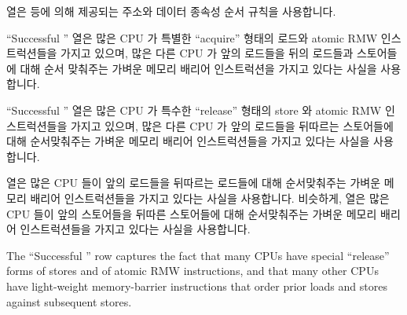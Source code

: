 {	 열은  등에 의해 제공되는
	주소와 데이터 종속성 순서 규칙을 사용합니다.

	``Successful '' 열은 많은 CPU 가 특별한 ``acquire''
	형태의 로드와 atomic RMW 인스트럭션들을 가지고 있으며, 많은 다른 CPU 가
	앞의 로드들을 뒤의 로드들과 스토어들에 대해 순서 맞춰주는 가벼운 메모리
	배리어 인스트럭션을 가지고 있다는 사실을 사용합니다.

	``Successful '' 열은 많은 CPU 가 특수한 ``release''
	형태의 store 와 atomic RMW 인스트럭션들을 가지고 있으며, 많은 다른 CPU
	가 앞의 로드들을 뒤따르는 스토어들에 대해 순서맞춰주는 가벼운 메모리
	배리어 인스트럭션들을 가지고 있다는 사실을 사용합니다.

	 열은 많은 CPU 들이 앞의 로드들을 뒤따르는 로드들에 대해
	순서맞춰주는 가벼운 메모리 배리어 인스트럭션들을 가지고 있다는 사실을
	사용합니다.
	비슷하게,
	 열은 많은 CPU 들이 앞의 스토어들을 뒤따른 스토어들에
	대해 순서맞춰주는 가벼운 메모리 배리어 인스트럭션들을 가지고 있다는
	사실을 사용합니다.
	\iffalse

	The ``Successful '' row captures the fact that many
	CPUs have special ``release'' forms of stores and of atomic RMW
	instructions, and that many other CPUs have light-weight memory-barrier
	instructions that order prior loads and stores against
	subsequent stores.

}
